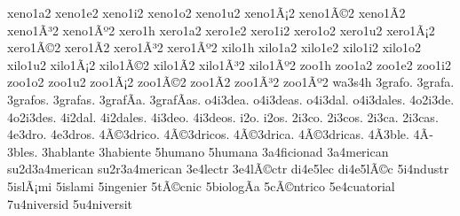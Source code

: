 {xeno1a2 xeno1e2 xeno1i2 xeno1o2 xeno1u2
xeno1Ã¡2 xeno1Ã©2 xeno1Ã­2 xeno1Ã³2 xeno1Ãº2
xero1h
xero1a2 xero1e2 xero1i2 xero1o2 xero1u2
xero1Ã¡2 xero1Ã©2 xero1Ã­2 xero1Ã³2 xero1Ãº2
xilo1h
xilo1a2 xilo1e2 xilo1i2 xilo1o2 xilo1u2
xilo1Ã¡2 xilo1Ã©2 xilo1Ã­2 xilo1Ã³2 xilo1Ãº2
zoo1h
zoo1a2 zoo1e2 zoo1i2 zoo1o2 zoo1u2
zoo1Ã¡2 zoo1Ã©2 zoo1Ã­2 zoo1Ã³2 zoo1Ãº2
wa3s4h
3grafo.
3grafa.
3grafos.
3grafas.
3grafÃ­a.
3grafÃ­as.
o4i3dea.
o4i3deas.
o4i3dal.
o4i3dales.
4o2i3de.
4o2i3des.
4i2dal.
4i2dales.
4i3deo.
4i3deos.
i2o.
i2os.
2i3co.
2i3cos.
2i3ca.
2i3cas.
4e3dro.
4e3dros.
4Ã©3drico.
4Ã©3dricos.
4Ã©3drica.
4Ã©3dricas.
4Ã­3ble.
4Ã­3bles.
3hablante
3habiente
5humano
5humana
3a4ficionad
3a4merican
su2d3a4merican
su2r3a4merican
3e4lectr
3e4lÃ©ctr
di4e5lec
di4e5lÃ©c
5i4ndustr
5islÃ¡mi
5islami
5ingenier
5tÃ©cnic
5biologÃ­a
5cÃ©ntrico
5e4cuatorial
7u4niversid
5u4niversit
}